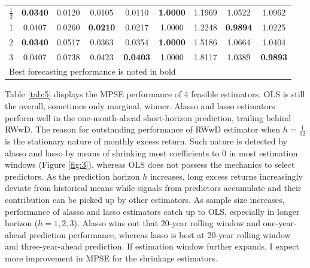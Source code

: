 \documentclass[12pt,a4paper]{article}
\begin{document}
\begin{table}[]
\begin{tabular}{ccccccccc}
\multicolumn{1}{|c|}{$ \frac{1}{2} $}  & \textbf{0.0340} & 0.0120          & 0.0105          & \multicolumn{1}{c|}{0.0110}          & \textbf{1.0000} & 1.1969          & 1.0522          & \multicolumn{1}{c|}{1.0962}          \\
\multicolumn{1}{|c|}{1}                & 0.0407          & 0.0260          & \textbf{0.0210} & \multicolumn{1}{c|}{0.0217}          & 1.0000          & 1.2248          & \textbf{0.9894} & \multicolumn{1}{c|}{1.0225}          \\
\multicolumn{1}{|c|}{2}                & \textbf{0.0340} & 0.0517          & 0.0363          & \multicolumn{1}{c|}{0.0354}          & \textbf{1.0000} & 1.5186          & 1.0664          & \multicolumn{1}{c|}{1.0404}          \\
\multicolumn{1}{|c|}{3}                & 0.0407          & 0.0738          & 0.0423          & \multicolumn{1}{c|}{\textbf{0.0403}} & 1.0000          & 1.8117          & 1.0389          & \multicolumn{1}{c|}{\textbf{0.9893}} \\ \hline
\multicolumn{9}{l}{Best forecasting performance is noted in bold}                                                                                                                                                               
\end{tabular}
\end{table}

Table \ref{tab:5} displays the MPSE performance of 4 feasible estimators. OLS is still the overall, sometimes only marginal, winner. Alasso and lasso estimators perform well in the one-month-ahead short-horizon prediction, trailing behind RWwD. The reason for outstanding performance of RWwD estimator when $ h =\frac{1}{12} $ is the stationary nature of monthly excess return. Such nature is detected by alasso and lasso by means of shrinking most coefficients to 0 in most estimation windows (Figure \ref{fig:3}), whereas OLS does not possess the mechanics to select predictors. As the prediction horizon $ h $ increases, long excess returns increasingly deviate from historical means while signals from predictors accumulate and their contribution can be picked up by other estimators. As sample size increases, performance of alasso and lasso estimators catch up to OLS, especially in longer horizon ($ h = 1, 2, 3 $). Alasso wins out that 20-year rolling window and one-year-ahead prediction performance, whereas lasso is best at 20-year rolling window and three-year-ahead prediction. If estimation window further expands, I expect more improvement in MPSE for the shrinkage estimators.
\end{document}
